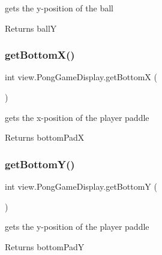 gets the y-\/position of the ball 

\begin{DoxyReturn}{Returns}
ballY 
\end{DoxyReturn}
\hypertarget{classview_1_1_pong_game_display_ab5d2d9429f7d666fea097c2ea3118893}{}\label{classview_1_1_pong_game_display_ab5d2d9429f7d666fea097c2ea3118893} 
\subsubsection{\texorpdfstring{get\+Bottom\+X()}{getBottomX()}}
{\footnotesize\ttfamily int view.\+Pong\+Game\+Display.\+get\+BottomX (\begin{DoxyParamCaption}{ }\end{DoxyParamCaption})}



gets the x-\/position of the player paddle 

\begin{DoxyReturn}{Returns}
bottom\+PadX 
\end{DoxyReturn}
\hypertarget{classview_1_1_pong_game_display_afa4d22c9959dc02057a1b56fef3f33cd}{}\label{classview_1_1_pong_game_display_afa4d22c9959dc02057a1b56fef3f33cd} 
\subsubsection{\texorpdfstring{get\+Bottom\+Y()}{getBottomY()}}
{\footnotesize\ttfamily int view.\+Pong\+Game\+Display.\+get\+BottomY (\begin{DoxyParamCaption}{ }\end{DoxyParamCaption})}



gets the y-\/position of the player paddle 

\begin{DoxyReturn}{Returns}
bottom\+PadY 
\end{DoxyReturn}
\hypertarget{classview_1_1_pong_game_display_a51b69bc0f6f840b4c736049115e0f449}{}\label{classview_1_1_pong_game_display_a51b69bc0f6f840b4c736049115e0f449} 

